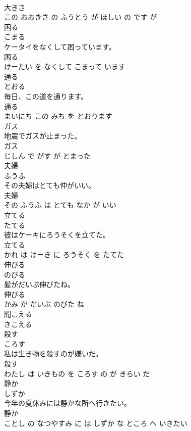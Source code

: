 \documentclass[8pt]{extreport}
\begin{document}
\begin{CJK}{UTF8}{min}
\\	大きさ 
\\	この おおきさ の ふうとう が ほしい の です が			
\\	困る	
\\	こまる			
\\	ケータイをなくして困っています。	
\\	困る 
\\	けーたい を なくして こまって います			
\\	通る	
\\	とおる			
\\	毎日、この道を通ります。	
\\	通る 
\\	まいにち この みち を とおります			
\\	ガス	
\\	地震でガスが止まった。	
\\	ガス 
\\	じしん で がす が とまった			
\\	夫婦	
\\	ふうふ			
\\	その夫婦はとても仲がいい。	
\\	夫婦 
\\	その ふうふ は とても なか が いい			
\\	立てる	
\\	たてる			
\\	彼はケーキにろうそくを立てた。	
\\	立てる 
\\	かれ は けーき に ろうそく を たてた			
\\	伸びる	
\\	のびる			
\\	髪がだいぶ伸びたね。	
\\	伸びる 
\\	かみ が だいぶ のびた ね			
\\	聞こえる	
\\	きこえる			
\\	殺す	
\\	ころす			
\\	私は生き物を殺すのが嫌いだ。	
\\	殺す 
\\	わたし は いきもの を ころす の が きらい だ			
\\	静か	
\\	しずか			
\\	今年の夏休みには静かな所へ行きたい。	
\\	静か 
\\	ことし の なつやすみ に は しずか な ところ へ いきたい			

\end{CJK}
\end{document}
